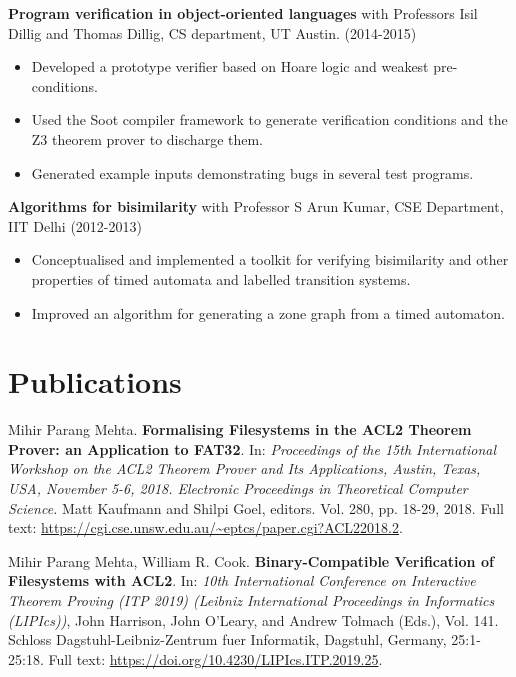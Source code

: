 \documentclass[margin]{res}
\begin{document}
\begin{resume}
 {\bf Program verification in object-oriented languages} with Professors Isil Dillig and Thomas
 Dillig, CS department, UT Austin. \hfill (2014-2015)
 \begin{itemize} \itemsep -2pt  %
 \item Developed a prototype verifier based on Hoare logic and weakest
   pre-conditions.
 \item Used the Soot compiler framework to generate
   verification conditions and the Z3 theorem prover to discharge them.
 \item Generated example
   inputs demonstrating bugs in several test programs.
 \end{itemize}

 {\bf Algorithms for bisimilarity} with Professor S
 Arun Kumar, CSE Department, IIT Delhi    \hfill
 (2012-2013)
 \begin{itemize} \itemsep -2pt
 \item Conceptualised and implemented a toolkit for
   verifying bisimilarity and other properties of timed automata
   and labelled transition systems.
 \item Improved an algorithm for generating a zone
   graph from a timed automaton.

 \end{itemize}

\section{Publications}
  Mihir Parang Mehta. {\bf Formalising Filesystems in the ACL2 Theorem
    Prover: an Application to FAT32}. In: \textit{Proceedings of the
    15th International Workshop on the ACL2 Theorem Prover and Its
    Applications, Austin, Texas, USA, November 5-6, 2018. Electronic
    Proceedings in Theoretical Computer Science.}  Matt Kaufmann and
  Shilpi Goel, editors.  Vol.  280, pp. 18-29, 2018. Full text:
  \url{https://cgi.cse.unsw.edu.au/~eptcs/paper.cgi?ACL22018.2}.

  Mihir Parang Mehta, William R. Cook. {\bf Binary-Compatible
    Verification of Filesystems with ACL2}. In: \textit{10th
    International Conference on Interactive Theorem Proving (ITP 2019)
    (Leibniz International Proceedings in Informatics (LIPIcs))}, John
  Harrison, John O'Leary, and Andrew Tolmach (Eds.), Vol. 141. Schloss
  Dagstuhl-Leibniz-Zentrum fuer Informatik, Dagstuhl, Germany,
  25:1-25:18. Full text:
  \url{https://doi.org/10.4230/LIPIcs.ITP.2019.25}.


\end{resume}
\end{document}
